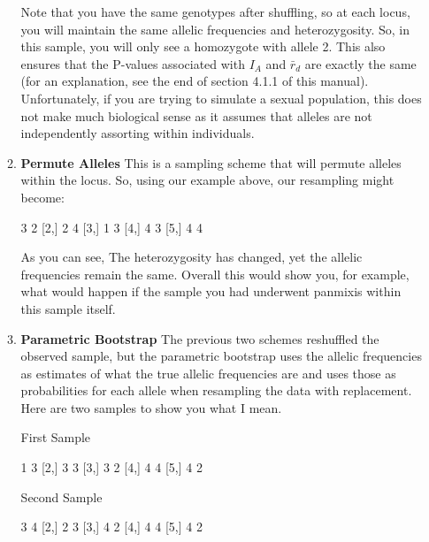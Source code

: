 \documentclass[letterpaper]{article}
\begin{document}
\begin{itemize}
\begin{enumerate}
Note that you have the same genotypes after shuffling, so at each locus, you will maintain the same allelic frequencies and heterozygosity. So, in this sample, you will only see a homozygote with allele 2. This also ensures that the P-values associated with $I_A$ and $\bar r_d$ are exactly the same (for an explanation, see the end of section 4.1.1 of this manual). Unfortunately, if you are trying to simulate a sexual population, this does not make much biological sense as it assumes that alleles are not independently assorting within individuals.
    \item \textbf{Permute Alleles} This is a sampling scheme that will permute alleles within the locus. So, using our example above, our resampling might become:
\begin{Schunk}
\begin{Soutput}
     [,1] [,2]
[1,]    3    2
[2,]    2    4
[3,]    1    3
[4,]    4    3
[5,]    4    4
\end{Soutput}
\end{Schunk}
As you can see, The heterozygosity has changed, yet the allelic frequencies remain the same. Overall this would show you, for example, what would happen if the sample you had underwent panmixis within this sample itself. 
    \item \textbf{Parametric Bootstrap} The previous two schemes reshuffled the observed sample, but the parametric bootstrap uses the allelic frequencies as estimates of what the true allelic frequencies are and uses those as probabilities for each allele when resampling the data with replacement. Here are two samples to show you what I mean.
\begin{Schunk}
\begin{Soutput}
First Sample
\end{Soutput}
\begin{Soutput}
     [,1] [,2]
[1,]    1    3
[2,]    3    3
[3,]    3    2
[4,]    4    4
[5,]    4    2
\end{Soutput}
\begin{Soutput}
Second Sample
\end{Soutput}
\begin{Soutput}
     [,1] [,2]
[1,]    3    4
[2,]    2    3
[3,]    4    2
[4,]    4    4
[5,]    4    2
\end{Soutput}
\end{Schunk}


\end{enumerate}
\end{itemize}
\end{document}

